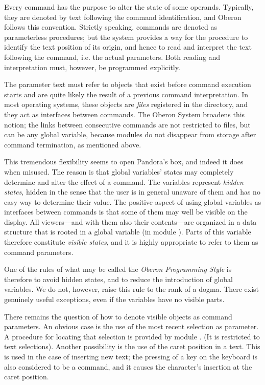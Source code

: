 {} \medskip

Every command has the purpose to alter the state of some
operands. Typically, they are denoted by text following the command
identification, and Oberon follows this convention. Strictly speaking,
commands are denoted as parameterless procedures; but the system
provides a way for the procedure to identify the text position of its
origin, and hence to read and interpret the text following the
command, i.e. the actual parameters. Both reading and interpretation
must, however, be programmed explicitly.

The parameter text must refer to objects that exist before command
execution starts and are quite likely the result of a previous command
interpretation. In most operating systems, these objects are \emph{files}
registered in the directory, and they act as interfaces between
commands. The Oberon System broadens this notion; the links between
consecutive commands are not restricted to files, but can be any
global variable, because modules do not disappear from storage after
command termination, as mentioned above.

This tremendous flexibility seems to open Pandora's box, and indeed it
does when misused. The reason is that global variables' states may
completely determine and alter the effect of a command. The variables
represent \emph{hidden states}, hidden in the sense that the user is in
general unaware of them and has no easy way to determine their
value. The positive aspect of using global variables as interfaces
between commands is that some of them may well be visible on the
display. All viewers---and with them also their contents---are
organized in a data structure that is rooted in a global variable (in
module ). Parts of this variable therefore constitute \emph{visible states},
and it is highly appropriate to refer to them as command
parameters.

One of the rules of what may be called the \emph{Oberon Programming Style} is
therefore to avoid hidden states, and to reduce the introduction of
global variables. We do not, however, raise this rule to the rank of a
dogma. There exist genuinely useful exceptions, even if the variables
have no visible parts.

There remains the question of how to denote visible objects as command
parameters. An obvious case is the use of the most recent selection as
parameter. A procedure for locating that selection is provided by
module . (It is restricted to text selections). Another
possibility is the use of the caret position in a text. This is used
in the case of inserting new text; the pressing of a key on the
keyboard is also considered to be a command, and it causes the
character's insertion at the caret position.

